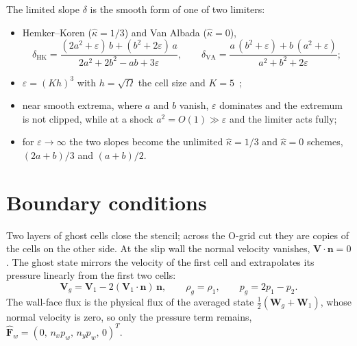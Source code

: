 \documentclass[12pt,a4paper]{article}
\begin{document}
The limited slope $\delta$ is the smooth form of one of two limiters:
\begin{itemize}
  \item Hemker--Koren ($\hat\kappa=1/3$) and Van Albada ($\hat\kappa=0$),
  \begin{equation}
    \delta_{\mathrm{HK}}=\frac{(2a^2+\varepsilon)\,b+(b^2+2\varepsilon)\,a}{2a^2+2b^2-ab+3\varepsilon},
    \qquad
    \delta_{\mathrm{VA}}=\frac{a\,(b^2+\varepsilon)+b\,(a^2+\varepsilon)}{a^2+b^2+2\varepsilon};
    \label{eq:limiters}
  \end{equation}
  \item $\varepsilon=(Kh)^3$ with $h=\sqrt{\Omega}$ the cell size and $K=5$~\cite{venkat1995};
  \item near smooth extrema, where $a$ and $b$ vanish, $\varepsilon$ dominates and the extremum
  is not clipped, while at a shock $a^2=O(1)\gg\varepsilon$ and the limiter acts fully;
  \item for $\varepsilon\to\infty$ the two slopes become the unlimited $\hat\kappa=1/3$ and
  $\hat\kappa=0$ schemes, $(2a+b)/3$ and $(a+b)/2$.
\end{itemize}

\clearpage
\section{Boundary conditions}\label{app:bc}

Two layers of ghost cells close the stencil; across the O-grid cut they are copies of the cells
on the other side. At the slip wall the normal velocity vanishes, $\mathbf{V}\cdot\mathbf{n}=0$.
The ghost state mirrors the velocity of the first cell and extrapolates its pressure linearly
from the first two cells:
\begin{equation}
  \mathbf{V}_g=\mathbf{V}_1-2(\mathbf{V}_1\cdot\mathbf{n})\,\mathbf{n},
  \qquad
  \rho_g=\rho_1,
  \qquad
  p_g=2p_1-p_2 .
  \label{eq:wall}
\end{equation}
The wall-face flux is the physical flux of the averaged state $\tfrac12(\mathbf{W}_g+\mathbf{W}_1)$,
whose normal velocity is zero, so only the pressure term remains,
$\widehat{\mathbf{F}}_w=(0,\,n_xp_w,\,n_yp_w,\,0)^T$.
\end{document}
